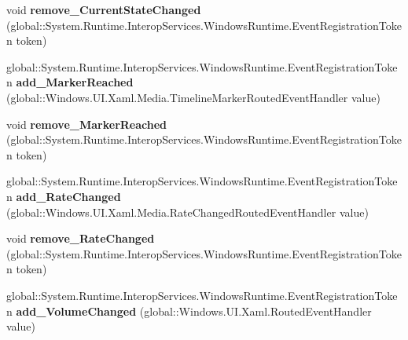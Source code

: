 \begin{DoxyCompactItemize}
\item 
\mbox{\label{interface_windows_1_1_u_i_1_1_xaml_1_1_controls_1_1_i_media_element_ae3f1850941fbf004a45cd333886cd5ff}} 
void {\bfseries remove\+\_\+\+Current\+State\+Changed} (global\+::\+System.\+Runtime.\+Interop\+Services.\+Windows\+Runtime.\+Event\+Registration\+Token token)
\item 
\mbox{\label{interface_windows_1_1_u_i_1_1_xaml_1_1_controls_1_1_i_media_element_abe1f11754f86e35e5a3b093554c58043}} 
global\+::\+System.\+Runtime.\+Interop\+Services.\+Windows\+Runtime.\+Event\+Registration\+Token {\bfseries add\+\_\+\+Marker\+Reached} (global\+::\+Windows.\+U\+I.\+Xaml.\+Media.\+Timeline\+Marker\+Routed\+Event\+Handler value)
\item 
\mbox{\label{interface_windows_1_1_u_i_1_1_xaml_1_1_controls_1_1_i_media_element_a0238b7aba4ea8d50a18b11bbccde3c0c}} 
void {\bfseries remove\+\_\+\+Marker\+Reached} (global\+::\+System.\+Runtime.\+Interop\+Services.\+Windows\+Runtime.\+Event\+Registration\+Token token)
\item 
\mbox{\label{interface_windows_1_1_u_i_1_1_xaml_1_1_controls_1_1_i_media_element_afdb9ef8dc66f874e5bd722e80ec927bb}} 
global\+::\+System.\+Runtime.\+Interop\+Services.\+Windows\+Runtime.\+Event\+Registration\+Token {\bfseries add\+\_\+\+Rate\+Changed} (global\+::\+Windows.\+U\+I.\+Xaml.\+Media.\+Rate\+Changed\+Routed\+Event\+Handler value)
\item 
\mbox{\label{interface_windows_1_1_u_i_1_1_xaml_1_1_controls_1_1_i_media_element_a9e5266118a01c36612caa255627e769e}} 
void {\bfseries remove\+\_\+\+Rate\+Changed} (global\+::\+System.\+Runtime.\+Interop\+Services.\+Windows\+Runtime.\+Event\+Registration\+Token token)
\item 
\mbox{\label{interface_windows_1_1_u_i_1_1_xaml_1_1_controls_1_1_i_media_element_aedd52f355cd6b0ac289dab97618b03b2}} 
global\+::\+System.\+Runtime.\+Interop\+Services.\+Windows\+Runtime.\+Event\+Registration\+Token {\bfseries add\+\_\+\+Volume\+Changed} (global\+::\+Windows.\+U\+I.\+Xaml.\+Routed\+Event\+Handler value)

\end{DoxyCompactItemize}

